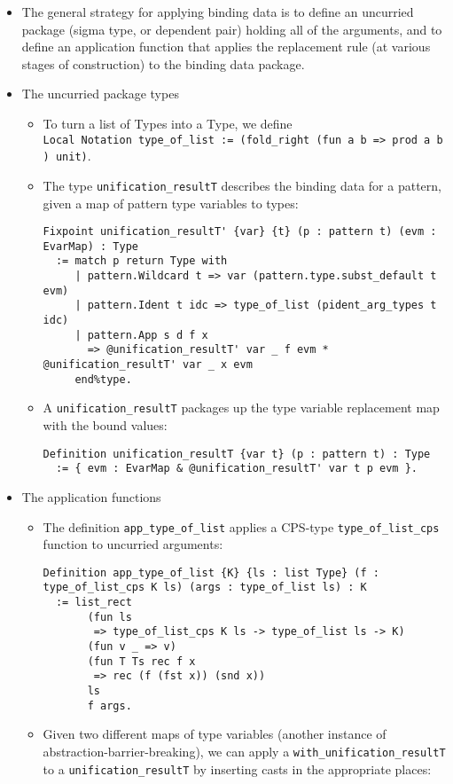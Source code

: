 \begin{itemize}
  \begin{itemize}
  \tightlist
  \item
    The general strategy for applying binding data is to define an
    uncurried package (sigma type, or dependent pair) holding all of the
    arguments, and to define an application function that applies the
    replacement rule (at various stages of construction) to the binding
    data package.
  \item
    The uncurried package types

    \begin{itemize}
    \item
      To turn a list of Types into a Type, we define
      \texttt{Local\ Notation\ type\_of\_list\ :=\ (fold\_right\ (fun\ a\ b\ =\textgreater{}\ prod\ a\ b)\ unit)}.
    \item
      The type \texttt{unification\_resultT\textquotesingle{}} describes
      the binding data for a pattern, given a map of pattern type
      variables to types:

\begin{verbatim}
Fixpoint unification_resultT' {var} {t} (p : pattern t) (evm : EvarMap) : Type
  := match p return Type with
     | pattern.Wildcard t => var (pattern.type.subst_default t evm)
     | pattern.Ident t idc => type_of_list (pident_arg_types t idc)
     | pattern.App s d f x
       => @unification_resultT' var _ f evm * @unification_resultT' var _ x evm
     end%type.
\end{verbatim}
    \item
      A \texttt{unification\_resultT} packages up the type variable
      replacement map with the bound values:

\begin{verbatim}
Definition unification_resultT {var t} (p : pattern t) : Type
  := { evm : EvarMap & @unification_resultT' var t p evm }.
\end{verbatim}
    \end{itemize}
  \item
    The application functions

    \begin{itemize}
    \item
      The definition \texttt{app\_type\_of\_list} applies a CPS-type
      \texttt{type\_of\_list\_cps} function to uncurried arguments:

\begin{verbatim}
Definition app_type_of_list {K} {ls : list Type} (f : type_of_list_cps K ls) (args : type_of_list ls) : K
  := list_rect
       (fun ls
        => type_of_list_cps K ls -> type_of_list ls -> K)
       (fun v _ => v)
       (fun T Ts rec f x
        => rec (f (fst x)) (snd x))
       ls
       f args.
\end{verbatim}
    \item
      Given two different maps of type variables (another instance of
      abstraction-barrier-breaking), we can apply a
      \texttt{with\_unification\_resultT\textquotesingle{}} to a
      \texttt{unification\_resultT\textquotesingle{}} by inserting casts
      in the appropriate places:


\end{itemize}
\end{itemize}
\end{itemize}
